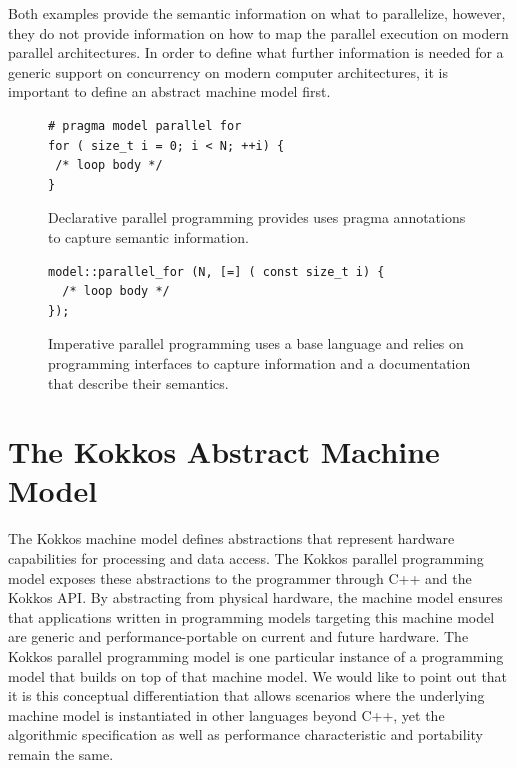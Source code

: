 Both examples provide the semantic information on what to parallelize, however, they do not provide information on how to map the parallel execution on modern parallel architectures. In order to define what further information is needed for a generic support on concurrency on modern computer architectures, it is important to define an abstract machine model first.

\begin{figure}
\begin{Verbatim}[frame=leftline]
# pragma model parallel for
for ( size_t i = 0; i < N; ++i) {
 /* loop body */
}
\end{Verbatim}
\caption{Declarative parallel programming provides uses pragma annotations to capture semantic information.}
\label{figOMPLike}
\end{figure}

\begin{figure}
\begin{Verbatim}[frame=leftline]
model::parallel_for (N, [=] ( const size_t i) {
  /* loop body */
});
\end{Verbatim}
\caption{Imperative parallel programming uses a base language and relies on programming interfaces to capture information and a documentation that describe their semantics.}
\label{figKokkosLike}
\end{figure}

\section{The Kokkos Abstract Machine Model}\label{chap:kokkosMM}

The Kokkos machine model defines abstractions that represent hardware capabilities for processing and data access. The Kokkos parallel programming model exposes these abstractions to the programmer through C++ and the Kokkos API. By abstracting from physical hardware, the machine model ensures that applications written in programming models targeting this machine model are generic and performance-portable on current and future hardware. The Kokkos parallel programming model is one particular instance of a programming model that builds on top of that machine model. We would like to point out that it is this conceptual differentiation that allows scenarios where the underlying machine model is instantiated in other languages beyond C++, yet the algorithmic specification as well as performance characteristic and portability remain the same. 

